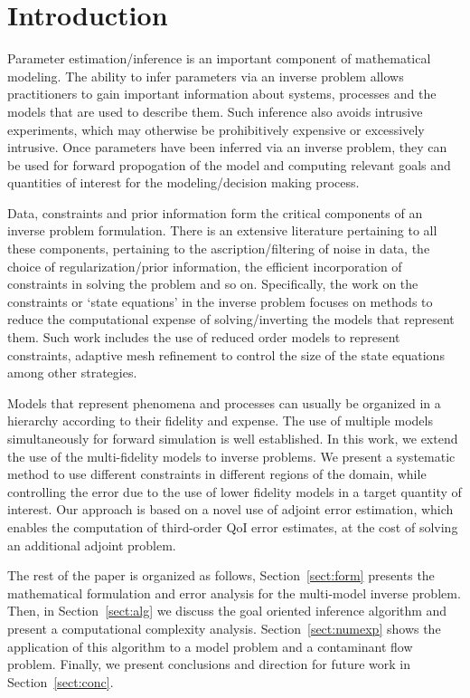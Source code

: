 \section{Introduction}

Parameter estimation/inference is an important component of mathematical modeling. The ability to infer parameters via an inverse problem allows practitioners to gain important information about systems, processes and the models that are used to describe them. Such inference also avoids intrusive experiments, which may otherwise be prohibitively expensive or excessively intrusive. Once parameters have been inferred via an inverse problem, they can be used for forward propogation of the model and computing relevant goals and quantities of interest for the modeling/decision making process.

Data, constraints and prior information form the critical components of an inverse problem formulation. There is an extensive literature pertaining to all these components, pertaining to the ascription/filtering of noise in data, the choice of regularization/prior information, the efficient incorporation of constraints in solving the problem and so on. Specifically, the work on the constraints or `state equations' in the inverse problem focuses on methods to reduce the computational expense of solving/inverting the models that represent them. Such work includes the use of reduced order models to represent constraints, adaptive mesh refinement to control the size of the state equations among other strategies.

Models that represent phenomena and processes can usually be organized in a hierarchy according to their fidelity and expense. The use of multiple models simultaneously for forward simulation is well established. In this work, we extend the use of the multi-fidelity models to inverse problems. We present a systematic method to use different constraints in different regions of the domain, while controlling the error due to the use of lower fidelity models in a target quantity of interest. Our approach is based on a novel use of adjoint error estimation, which enables the computation of third-order QoI error estimates, at the cost of solving an additional adjoint problem. 

The rest of the paper is organized as follows, Section~\ref{sect:form} presents the mathematical formulation and error analysis for the multi-model inverse problem. Then, in Section~\ref{sect:alg} we discuss the goal oriented inference algorithm and present a computational complexity analysis. Section~\ref{sect:numexp} shows the application of this algorithm to a model problem and a contaminant flow problem. Finally, we present conclusions and direction for future work in Section~\ref{sect:conc}.


